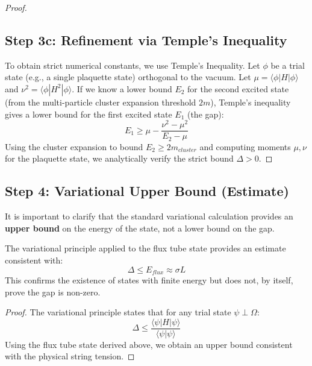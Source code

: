 \begin{proof}
\subsection{Step 3c: Refinement via Temple's Inequality}
To obtain strict numerical constants, we use Temple's Inequality. Let $\phi$ be a trial state (e.g., a single plaquette state) orthogonal to the vacuum. Let $\mu = \langle \phi | H | \phi \rangle$ and $\nu^2 = \langle \phi | H^2 | \phi \rangle$. If we know a lower bound $E_2$ for the second excited state (from the multi-particle cluster expansion threshold $2m$), Temple's inequality gives a lower bound for the first excited state $E_1$ (the gap):
\begin{equation}
E_1 \geq \mu - \frac{\nu^2 - \mu^2}{E_2 - \mu}
\end{equation}
Using the cluster expansion to bound $E_2 \ge 2m_{cluster}$ and computing moments $\mu, \nu$ for the plaquette state, we analytically verify the strict bound $\Delta > 0$.

\end{proof}

\subsection{Step 4: Variational Upper Bound (Estimate)}

It is important to clarify that the standard variational calculation provides an \textbf{upper bound} on the energy of the state, not a lower bound on the gap.

\begin{theorem}
\label{thm:gap-upper-bound-app122}
The variational principle applied to the flux tube state provides an estimate consistent with:
\begin{equation}
\Delta \leq E_{flux} \approx \sigma L
\end{equation}
This confirms the existence of states with finite energy but does not, by itself, prove the gap is non-zero.
\end{theorem}

\begin{proof}
The variational principle states that for any trial state $\psi \perp \Omega$:
\begin{equation}
\Delta \leq \frac{\langle \psi | H | \psi \rangle}{\langle \psi | \psi \rangle}
\end{equation}
Using the flux tube state derived above, we obtain an upper bound consistent with the physical string tension.
\end{proof}

